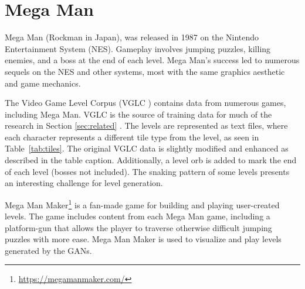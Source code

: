 \section{Mega Man}


Mega Man (Rockman in Japan), was released in 1987 on the Nintendo Entertainment System (NES). Gameplay involves jumping puzzles, killing enemies, and a boss at the end of each level. Mega Man's success led to numerous sequels on the NES and other systems, most with the same graphics aesthetic and game mechanics.


The Video Game Level Corpus (VGLC \cite{summerville:vglc2016}) contains data from numerous games, including Mega Man. VGLC is the source of training data for 
much of the research in Section \ref{sec:related} \cite{volz:gecco2018,gutierrez2020zeldagan,giacomello:cog19,sarkar:fdg2020,schrum:gecco2020cppn2gan,schrum2020interactive}. The levels are represented as text files, where each character represents a different tile type from the level, as seen in %
Table~\ref{tab:tiles}. The original VGLC data is slightly modified and enhanced as described in the table caption. Additionally, a level orb is added to mark the end of each level (bosses not included).
The snaking pattern of some levels presents an interesting challenge for level generation. 


Mega Man Maker\footnote{\url{https://megamanmaker.com/}} is a fan-made game for building and playing user-created levels. The game includes content from each Mega Man game, including a platform-gun that allows the player to traverse otherwise difficult jumping puzzles with more ease. Mega Man Maker is used to visualize and play levels generated by the GANs.


